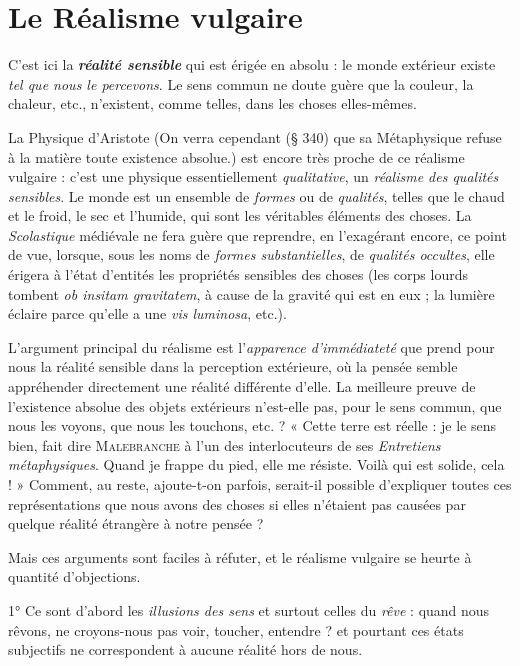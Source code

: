 \section{Le Réalisme vulgaire}%
C'est ici la \textbf{\textit {réalité sensible}} qui
est érigée en absolu : le monde extérieur existe {\it tel que nous le percevons}.
Le sens commun ne doute guère que la couleur, la chaleur, etc.,
n'existent, comme telles, dans les choses elles-mêmes.

La Physique d'Aristote
{\scriptsize (On verra cependant (§ 340) que sa Métaphysique refuse à la matière toute existence
absolue.)}
est encore très proche de ce réalisme vulgaire :
c'est une physique essentiellement {\it qualitative}, un \textsf{\textit {réalisme des qualités sensibles}}.
Le monde est un ensemble de {\it formes} ou de {\it qualités}, telles que le chaud et le
froid, le sec et l’humide, qui sont les véritables éléments des choses. La
{\it Scolastique} médiévale ne fera guère que reprendre, en l’exagérant encore,
ce point de vue, lorsque, sous les noms de {\it formes substantielles}, de {\it qualités
occultes}, elle érigera à l'état d’entités les propriétés sensibles des choses
(les corps lourds tombent {\it ob insitam gravitatem}, à cause de la gravité qui
est en eux ; la lumière éclaire parce qu’elle a une {\it vis luminosa}, etc.).

L’argument principal du réalisme est l'{\it apparence d'immédiateté}
que prend pour nous la réalité sensible dans la perception extérieure,
où la pensée semble appréhender directement une réalité différente
d’elle. La meilleure preuve de l’existence absolue des objets extérieurs
n'est-elle pas, pour le sens commun, que nous les voyons, que nous les
touchons, etc. ? « Cette terre est réelle : je le sens bien, fait dire
\textsc{Malebranche} à l’un des interlocuteurs de ses {\it Entretiens métaphysiques}.
Quand je frappe du pied, elle me résiste. Voilà qui est solide,
cela ! » Comment, au reste, ajoute-t-on parfois, serait-il possible
d’expliquer toutes ces représentations que nous avons des choses si
elles n'étaient pas causées par quelque réalité étrangère à notre pensée ?

Mais ces arguments sont faciles à réfuter, et le réalisme vulgaire
se heurte à quantité d’objections.

1° Ce sont d’abord les {\it illusions des sens} et surtout celles du {\it rêve} :
quand nous rêvons, ne croyons-nous pas voir, toucher, entendre ?
et pourtant ces états subjectifs ne correspondent à aucune réalité
hors de nous.

